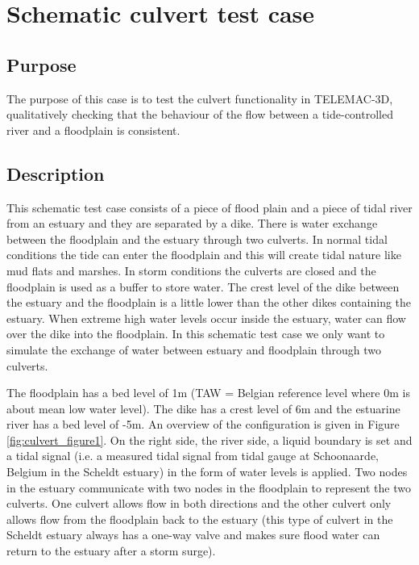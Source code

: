 \chapter{Schematic culvert test case}
%

%
\section{Purpose}
%
The purpose of this case is to test the culvert functionality in TELEMAC-3D, qualitatively checking that
the behaviour of the flow between a tide-controlled river and a floodplain is consistent.

\section{Description}
%
This schematic test case consists of a piece of flood plain and a piece of tidal river 
from an estuary and they are separated by a dike. 
There is water exchange between the floodplain and the estuary through two culverts. 
In normal tidal conditions the tide can enter the floodplain and this will create tidal nature like mud flats and marshes. 
In storm conditions the culverts are closed and the floodplain is used as a buffer to store water. 
The crest level of the dike between the estuary and the floodplain is a little lower than the other dikes containing the estuary. 
When extreme high water levels occur inside the estuary, water can flow over the dike into the floodplain. 
In this schematic test case we only want to simulate the exchange of water between estuary and floodplain through two culverts. 

The floodplain has a bed level of 1m (TAW = Belgian reference level where 0m is about mean low water level). 
The dike has a crest level of 6m and the estuarine river has a bed level of -5m. 
An overview of the configuration is given in Figure \ref{fig:culvert_figure1}. 
On the right side, the river side, a liquid boundary is set and a tidal signal 
(i.e. a measured tidal signal from tidal gauge at Schoonaarde, Belgium in the Scheldt estuary) 
in the form of water levels is applied. 
Two nodes in the estuary communicate with two nodes in the floodplain to represent the two culverts. 
One culvert allows flow in both directions and the other culvert only allows flow from the floodplain back to the estuary 
(this type of culvert in the Scheldt estuary always has a one-way valve and makes sure flood water can return to the estuary after a storm surge).

